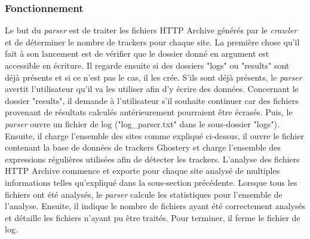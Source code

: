 \subsubsection{Fonctionnement}
Le but du \textit{parser} est de traiter les fichiers HTTP Archive générés par le \textit{crawler} et de déterminer le nombre de trackers pour chaque site. La première chose qu'il fait à son lancement est de vérifier que le dossier donné en argument est accessible en écriture. Il regarde ensuite si des dossiers "logs" ou "results" sont déjà présents et si ce n'est pas le cas, il les crée. S'ils sont déjà présents, le \textit{parser} avertit l'utilisateur qu'il va les utiliser afin d'y écrire des données. Concernant le dossier "results", il demande à l'utilisateur s'il souhaite continuer car des fichiers provenant de résultats calculés antérieurement pourraient être écrasés. Puis, le \textit{parser} ouvre un fichier de log ("log\_parser.txt" dans le sous-dossier "logs"). Ensuite, il charge l'ensemble des sites comme expliqué ci-dessus, il ouvre le fichier contenant la base de données de trackers Ghostery et charge l'ensemble des expressions régulières utilisées afin de détecter les trackers. L'analyse des fichiers HTTP Archive commence et exporte pour chaque site analysé de multiples informations telles qu'expliqué dans la sous-section précédente. Lorsque tous les fichiers ont été analysés, le \textit{parser} calcule les statistiques pour l'ensemble de l'analyse. Ensuite, il indique le nombre de fichiers ayant été correctement analysés et détaille les fichiers n'ayant pu être traités. Pour terminer, il ferme le fichier de log.
